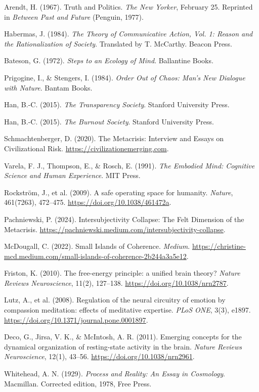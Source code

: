\documentclass[12pt,a4paper]{article}
\begin{document}
\begin{thebibliography}{99}

Arendt, H. (1967). Truth and Politics. \emph{The New Yorker}, February 25. Reprinted in \emph{Between Past and Future} (Penguin, 1977).

Habermas, J. (1984). \emph{The Theory of Communicative Action, Vol. 1: Reason and the Rationalization of Society}. Translated by T. McCarthy. Beacon Press.

Bateson, G. (1972). \emph{Steps to an Ecology of Mind}. Ballantine Books.

Prigogine, I., \& Stengers, I. (1984). \emph{Order Out of Chaos: Man's New Dialogue with Nature}. Bantam Books.

Han, B.-C. (2015). \emph{The Transparency Society}. Stanford University Press.

Han, B.-C. (2015). \emph{The Burnout Society}. Stanford University Press.

Schmachtenberger, D. (2020). The Metacrisis: Interview and Essays on Civilizational Risk. \url{https://civilizationemerging.com}.

Varela, F. J., Thompson, E., \& Rosch, E. (1991). \emph{The Embodied Mind: Cognitive Science and Human Experience}. MIT Press.

Rockström, J., et al. (2009). A safe operating space for humanity. \emph{Nature}, 461(7263), 472--475. \url{https://doi.org/10.1038/461472a}.

Pachniewski, P. (2024). Intersubjectivity Collapse: The Felt Dimension of the Metacrisis. \url{https://pachniewski.medium.com/intersubjectivity-collapse}.

McDougall, C. (2022). Small Islands of Coherence. \emph{Medium}. \url{https://christine-mcd.medium.com/small-islands-of-coherence-2b244a3a5e12}.

Friston, K. (2010). The free-energy principle: a unified brain theory? \emph{Nature Reviews Neuroscience}, 11(2), 127--138. \url{https://doi.org/10.1038/nrn2787}.

Lutz, A., et al. (2008). Regulation of the neural circuitry of emotion by compassion meditation: effects of meditative expertise. \emph{PLoS ONE}, 3(3), e1897. \url{https://doi.org/10.1371/journal.pone.0001897}.

Deco, G., Jirsa, V. K., \& McIntosh, A. R. (2011). Emerging concepts for the dynamical organization of resting-state activity in the brain. \emph{Nature Reviews Neuroscience}, 12(1), 43--56. \url{https://doi.org/10.1038/nrn2961}.

Whitehead, A. N. (1929). \emph{Process and Reality: An Essay in Cosmology}. Macmillan. Corrected edition, 1978, Free Press.

\end{thebibliography}
\end{document}
